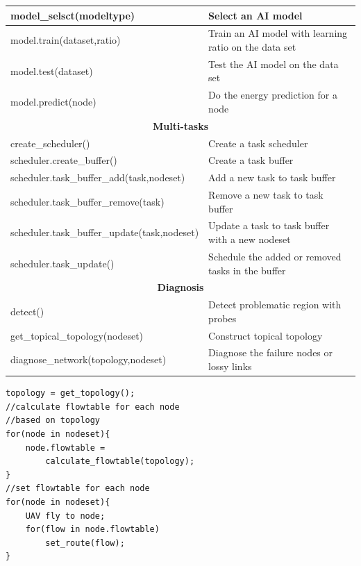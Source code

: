 \begin{table}[htbp]
{\begin{tabular}{|l|l|}
		\hline
		model\_selsct(modeltype) & Select an AI model\\
		\hline
		model.train(dataset,ratio) & Train an AI model with learning ratio on the data set\\
		\hline
		model.test(dataset) & Test the AI model on the data set\\
		\hline
		model.predict(node) & Do the energy prediction for a node \\
		\hline
		\multicolumn{2}{|c|}{\textbf{Multi-tasks}}\\
		\hline
		create\_scheduler() & Create a task scheduler \\
		\hline
		scheduler.create\_buffer() & Create a task buffer \\
		\hline
		scheduler.task\_buffer\_add(task,nodeset) & Add a new task to task buffer \\
		\hline
		scheduler.task\_buffer\_remove(task) & Remove a new task to task buffer \\
		\hline
		scheduler.task\_buffer\_update(task,nodeset) & Update a task to task buffer with a new nodeset \\
		\hline
		scheduler.task\_update() & Schedule the added or removed tasks in the buffer\\
		\hline
		\multicolumn{2}{|c|}{\textbf{Diagnosis}}\\
		\hline
		detect() & Detect problematic region with probes \\
		\hline
		get\_topical\_topology(nodeset) & Construct topical topology\\
		\hline
		diagnose\_network(topology,nodeset) & Diagnose the failure nodes or lossy links\\
		\hline
	\end{tabular}
	}
\end{table}

\begin{lstlisting}[language={[ANSI]C},label=update,caption={An example of deploy routing algorithm},keywordstyle=\color{blue!70},showstringspaces=false, commentstyle=\color{red!50!green!80!blue!70},frame=single,captionpos=t, rulesepcolor=\color{red!20!green!20!blue!20}]
topology = get_topology();
//calculate flowtable for each node 
//based on topology 
for(node in nodeset){
	node.flowtable = 
		calculate_flowtable(topology);
}
//set flowtable for each node
for(node in nodeset){
	UAV fly to node;
	for(flow in node.flowtable) 
  		set_route(flow);
}

\end{lstlisting}

